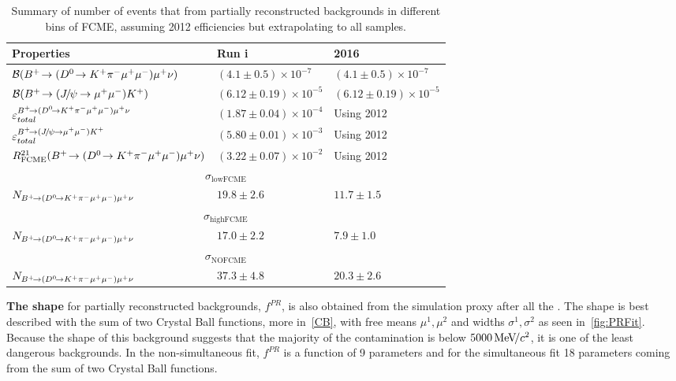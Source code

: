 
\begin{table}[ht]
\begin{center}
\begin{tabular}{ l  l  l }
\toprule
Properties & Run \Rn{1} & 2016  \\
\midrule
$\mathcal{B}(\pr)$ & $(4.1\pm0.5)\times 10 ^{-7 }$ &$(4.1\pm0.5)\times 10 ^{-7 }$ \\
$\mathcal{B}(\bjpsimumuk)$ &$(6.12\pm0.19)\times 10 ^{-5 }$ & $(6.12\pm0.19)\times 10 ^{-5 }$ \\
$\varepsilon^{\pr}_{total}$ &  $(1.87\pm0.04)\times 10 ^{-4 }$ & Using 2012  \\
$\varepsilon^{\bjpsimumuk}_{total}$ & $(5.80\pm0.01)\times 10 ^{-3 }$ &  Using 2012 \\
$R_{\mathrm{FCME}}^{21}(\pr)$ & $(3.22\pm0.07)\times 10 ^{-2 }$ &  Using 2012 \\
\midrule
	\multicolumn{3}{c}{{$\sigma_{\mathrm{lowFCME}}$}}  \\
$N_{\pr}$ & $19.8\pm2.6$ & $11.7\pm1.5$ \\
\midrule
	\multicolumn{3}{c}{{$\sigma_{\mathrm{highFCME}}$}}  \\
$N_{\pr}$  & $17.0\pm2.2$ & $7.9\pm1.0$ \\
\midrule
	\multicolumn{3}{c}{{$\sigma_{\mathrm{NOFCME}}$}}  \\
$N_{\pr}$ & $37.3\pm4.8$ & $20.3\pm2.6$ \\
\bottomrule
\end{tabular}
\end{center}
\caption{Summary of number of events that \DIFdelbeginFL {}\DIFdelendFL \DIFaddbeginFL {}\DIFaddendFL from partially reconstructed backgrounds in different bins of FCME, assuming 2012 efficiencies but extrapolating to all samples.}
\label{tab:prsum}
\end{table}

\textbf{The shape} for partially reconstructed backgrounds, $f^{PR}$, is also obtained from the simulation proxy after all the \DIFdelbegin {}\DIFdelend \DIFaddbegin {}\DIFaddend .
The shape is best described with the sum of two Crystal Ball functions, more in~\autoref{CB}, with free means $\mu^{1},\mu^{2}$ and widths $\sigma^{1},\sigma^{2}$ as seen in~\autoref{fig:PRFit}. Because the shape of this background suggests that the majority of the contamination is below $5000\mevcc$, it is one of the least dangerous backgrounds. In the non-simultaneous fit, $f^{PR}$ is a function of 9 parameters and for the simultaneous fit 18 parameters coming from the sum of two Crystal Ball functions. %


